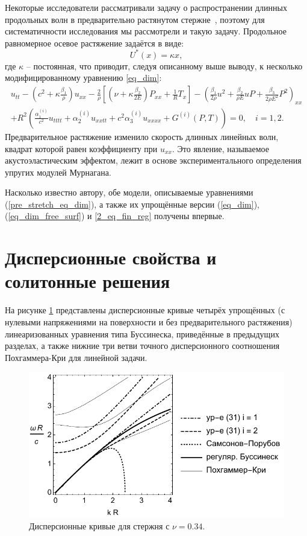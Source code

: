 \documentclass[12pt, a4paper]{article}
\begin{document}
Некоторые исследователи рассматривали задачу о распространении длинных продольных волн в предварительно растянутом стержне~\cite{DC}, поэтому для систематичности исследования мы рассмотрели и такую задачу. 
Продольное равномерное осевое растяжение задаётся в виде:
\begin{equation}\label{pre_stretch_u}
U^*(x) = \kappa x,
\end{equation}
где $\kappa$ -- постоянная, что приводит, следуя описанному выше выводу, к несколько модифицированному уравнению \eqref{eq_dim}:
\begin{equation}\label{pre_stretch_eq_dim}
\begin{split}
u_{tt} - \left(c^2 + \kappa\frac{\beta_1}{\rho}\right) u_{xx} - \frac{2}{\rho}\left[\left(\nu + \kappa \frac{\beta_2}{2E} \right) P_{xx} + \frac1R T_x\right] - \left(\frac{\beta_1}{2\rho} u^2 + \frac{\beta_2}{\rho E} u P + \frac{\beta_3}{2\rho E^2} P^2\right)_{xx}\\
+ R^2 \left(\frac{\alpha_1^{(i)}}{c^2} u_{tttt} + \alpha_2^{(i)} u_{xxtt} + c^2\alpha_3^{(i)} u_{xxxx} + G^{(i)}(P, T) \right) = 0, \quad i = 1,2.
\end{split}
\end{equation}
Предварительное растяжение изменило скорость длинных линейных волн, квадрат которой равен коэффициенту при $u_{xx}$. 
Это явление, называемое акустоэластическим эффектом, лежит в основе экспериментального определения упругих модулей Мурнагана.

Насколько известно автору, обе модели, описываемые уравнениями (\ref{pre_stretch_eq_dim}), а также их упрощённые версии (\ref{eq_dim}), (\ref{eq_dim_free_surf}) и \eqref{2_eq_fin_reg} получены впервые. 



\section{Дисперсионные свойства и солитонные решения}

На рисунке \ref{fig:disp} представлены дисперсионные кривые четырёх упрощённых (с нулевыми напряжениями на поверхности и без предварительного растяжения) линеаризованных уравнения типа Буссинеска, приведённые в предыдущих разделах, а также нижние три ветви точного дисперсионного соотношения Похгаммера-Кри для линейной задачи.
\begin{figure}[h]
	\centering
	\includegraphics[width=0.65\linewidth]{2_DispBlackSmall}
	\caption{Дисперсионные кривые для стержня с $\nu = 0.34$.}
	\label{fig:disp}
\end{figure} 
\end{document}
